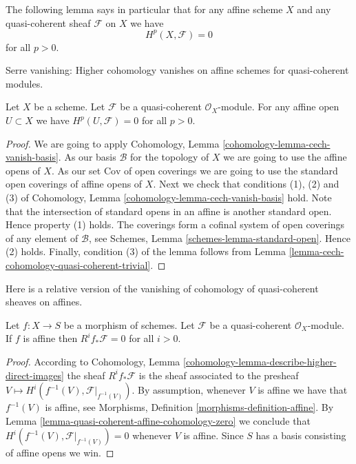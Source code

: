 \noindent
The following lemma says in particular that for any affine scheme
$X$ and any quasi-coherent sheaf $\mathcal{F}$ on $X$ we have
$$
H^p(X, \mathcal{F}) = 0
$$
for all $p > 0$.

\begin{lemma}
\label{lemma-quasi-coherent-affine-cohomology-zero}
\begin{slogan}
Serre vanishing: Higher cohomology vanishes on affine schemes
for quasi-coherent modules.
\end{slogan}
Let $X$ be a scheme.
Let $\mathcal{F}$ be a quasi-coherent $\mathcal{O}_X$-module.
For any affine open $U \subset X$ we have
$H^p(U, \mathcal{F}) = 0$ for all $p > 0$.
\end{lemma}

\begin{proof}
We are going to apply
Cohomology, Lemma \ref{cohomology-lemma-cech-vanish-basis}.
As our basis $\mathcal{B}$ for the topology of $X$ we are going to use
the affine opens of $X$.
As our set $\text{Cov}$ of open coverings we are going to use the standard
open coverings of affine opens of $X$.
Next we check that conditions (1), (2) and (3) of
Cohomology, Lemma \ref{cohomology-lemma-cech-vanish-basis}
hold. Note that the intersection of standard opens in an affine is
another standard open. Hence property (1) holds.
The coverings form a cofinal system of open coverings of any element
of $\mathcal{B}$, see
Schemes, Lemma \ref{schemes-lemma-standard-open}.
Hence (2) holds.
Finally, condition (3) of the lemma follows from
Lemma \ref{lemma-cech-cohomology-quasi-coherent-trivial}.
\end{proof}

\noindent
Here is a relative version of the vanishing of cohomology of quasi-coherent
sheaves on affines.

\begin{lemma}
\label{lemma-relative-affine-vanishing}
Let $f : X \to S$ be a morphism of schemes.
Let $\mathcal{F}$ be a quasi-coherent $\mathcal{O}_X$-module.
If $f$ is affine then $R^if_*\mathcal{F} = 0$ for all $i > 0$.
\end{lemma}

\begin{proof}
According to
Cohomology, Lemma \ref{cohomology-lemma-describe-higher-direct-images}
the sheaf
$R^if_*\mathcal{F}$ is the sheaf associated to the presheaf
$V \mapsto H^i(f^{-1}(V), \mathcal{F}|_{f^{-1}(V)})$.
By assumption, whenever $V$ is affine we have that $f^{-1}(V)$ is
affine, see Morphisms, Definition \ref{morphisms-definition-affine}.
By Lemma \ref{lemma-quasi-coherent-affine-cohomology-zero} we conclude that
$H^i(f^{-1}(V), \mathcal{F}|_{f^{-1}(V)}) = 0$
whenever $V$ is affine. Since $S$ has a basis consisting of affine
opens we win.
\end{proof}

